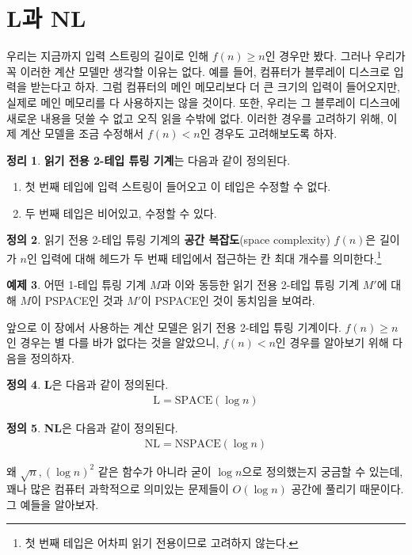 \documentclass[b5paper, 11pt]{book}
\theoremstyle{definition}
\newtheorem{defn}{정의}[chapter]
\newtheorem{thm}[defn]{정리}
\newtheorem{ex}[defn]{예제}
\begin{document}
\section{L과 NL}
우리는 지금까지 입력 스트링의 길이로 인해 $f(n) \ge n$인 경우만 봤다. 그러나 우리가 꼭 이러한 계산 모델만 생각할 이유는 없다. 예를 들어, 컴퓨터가 블루레이 디스크로 입력을 받는다고 하자. 그럼 컴퓨터의 메인 메모리보다 더 큰 크기의 입력이 들어오지만, 실제로 메인 메모리를 다 사용하지는 않을 것이다. 또한, 우리는 그 블루레이 디스크에 새로운 내용을 덧쓸 수 없고 오직 읽을 수밖에 없다. 이러한 경우를 고려하기 위해, 이제 계산 모델을 조금 수정해서 $f(n) < n$인 경우도 고려해보도록 하자.
\begin{thm}
    \textbf{읽기 전용 2-테입 튜링 기계}는 다음과 같이 정의된다.
    \begin{enumerate}
        \item 첫 번째 테입에 입력 스트링이 들어오고 이 테입은 수정할 수 없다. 
        \item 두 번째 테입은 비어있고, 수정할 수 있다.
    \end{enumerate}
\end{thm}
\begin{defn}
    읽기 전용 2-테입 튜링 기계의 \textbf{공간 복잡도}(space complexity) $f(n)$은 길이가 $n$인 입력에 대해 헤드가 두 번째 테입에서 접근하는 칸 최대 개수를 의미한다.\footnote{첫 번째 테입은 어차피 읽기 전용이므로 고려하지 않는다.}
\end{defn}
\begin{ex}
    어떤 1-테입 튜링 기계 $M$과 이와 동등한 읽기 전용 2-테입 튜링 기계 $M'$에 대해 $M$이 PSPACE인 것과 $M'$이 PSPACE인 것이 동치임을 보여라.
\end{ex}
앞으로 이 장에서 사용하는 계산 모델은 읽기 전용 2-테입 튜링 기계이다. $f(n) \ge n$인 경우는 별 다를 바가 없다는 것을 알았으니, $f(n) < n$인 경우를 알아보기 위해 다음을 정의하자. 
\begin{defn}
    \textbf{L}은 다음과 같이 정의된다.
    \begin{align*}
        \text{L} = \text{SPACE}(\log{n})
    \end{align*}
\end{defn}
\begin{defn}
    \textbf{NL}은 다음과 같이 정의된다.
    \begin{align*}
        \text{NL} = \text{NSPACE}(\log{n})
    \end{align*}
\end{defn}
왜 $\sqrt{n}, (\log{n})^2$ 같은 함수가 아니라 굳이 $\log{n}$으로 정의했는지 궁금할 수 있는데, 꽤나 많은 컴퓨터 과학적으로 의미있는 문제들이 $O(\log{n})$ 공간에 풀리기 때문이다. 그 예들을 알아보자.
\end{document}
